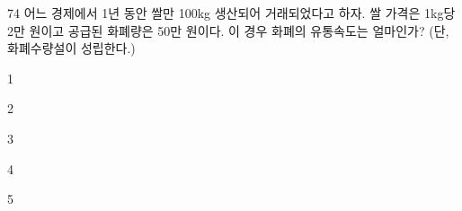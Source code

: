 \begin{question}{74}
어느 경제에서 1년 동안 쌀만 100kg 생산되어 거래되었다고 하자. 쌀 가격은 1kg당 2만 원이고 공급된 화폐량은 50만 원이다. 이 경우 화폐의 유통속도는 얼마인가? (단, 화폐수량설이 성립한다.)
\begin{choices}
  \item 1
  \item 2
  \item 3
  \item 4
  \item 5
\end{choices}
\end{question}
